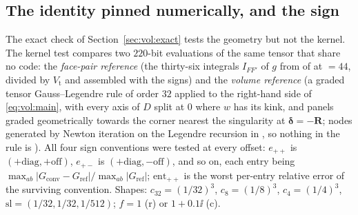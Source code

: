 \subsection{The identity pinned numerically, and the sign}
\label{sec:vol:pin}

The exact check of Section~\ref{sec:vol:exact} tests the geometry but not the kernel. The
kernel test compares two $220$-bit evaluations of the same tensor that share no code: the
\emph{face-pair reference} (the thirty-six integrals $I_{FF'}$ of $g$ from 
of  at  $=44$, divided by $V_{\mathrm{t}}$ and
assembled with the  signs) and the \emph{volume reference} (a graded
 tensor Gauss--Legendre rule of order $32$ applied to the right-hand side
of \eqref{eq:vol:main}, with every axis of $D$ split at $0$ where $w$ has its kink, and
panels graded geometrically towards the corner nearest the singularity at
$\boldsymbol{\delta} = -\mathbf{R}$; nodes generated by Newton iteration on the Legendre
recursion in , so nothing in the rule is ). All four sign
conventions were tested at every offset: $e_{++}$ is $(+\text{diag},+\text{off})$,
$e_{+-}$ is $(+\text{diag},-\text{off})$, and so on, each entry being
$\max_{ab}|G_{\text{conv}} - G_{\text{ref}}|/\max_{ab}|G_{\text{ref}}|$;
$\mathrm{ent}_{++}$ is the worst per-entry relative error of the surviving convention.
Shapes: $c_{32} = (1/32)^3$, $c_8 = (1/8)^3$, $c_4 = (1/4)^3$, $\mathrm{sl} =
(1/32,1/32,1/512)$; $f = 1$ (r) or $1+0.1\ii$ (c).

